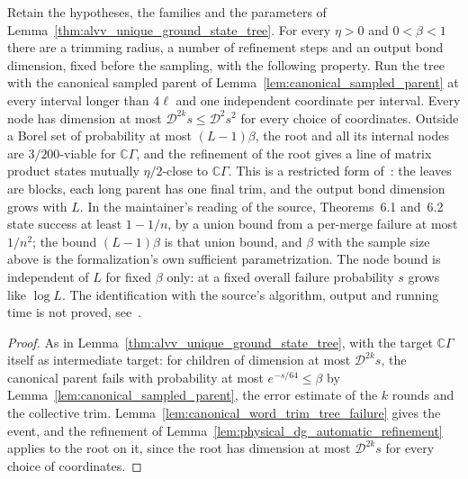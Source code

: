 \begin{lemma}
    \label{lem:alvv_unique_ground_state_tree_probability}
    \leanok
    Retain the hypotheses, the families and the parameters of
    Lemma~\ref{thm:alvv_unique_ground_state_tree}. For every $\eta>0$ and
    $0<\beta<1$ there are a trimming radius, a number of refinement steps and
    an output bond dimension, fixed before the sampling, with the following
    property. Run the tree with the canonical sampled parent of
    Lemma~\ref{lem:canonical_sampled_parent} at every interval longer than
    $4\ell$ and one independent coordinate per interval. Every node has
    dimension at most $\mathcal D^{2k}s\le\mathcal D^2s^2$ for every choice
    of coordinates. Outside a Borel set of probability at most $(L-1)\beta$,
    the root and all its internal nodes are $3/200$-viable for
    $\mathbb C\Gamma$, and the refinement of the root gives a line of matrix
    product states mutually $\eta/2$-close to $\mathbb C\Gamma$. This is a
    restricted form of~\cite[Theorem~\texttt{t:unique}, lines
        1829--1855]{Arad2016RigorousRG}: the leaves are blocks, each long
    parent has one final trim, and the output bond dimension grows with $L$.
    In the maintainer's reading of the source, Theorems~6.1 and~6.2 state
    success at least $1-1/n$, by a union bound from a per-merge failure at
    most $1/n^2$; the bound $(L-1)\beta$ is that union bound, and $\beta$
    with the sample size above is the formalization's own sufficient
    parametrization. The node bound is independent of $L$ for fixed $\beta$
    only: at a fixed overall failure probability $s$ grows like $\log L$.
    The identification with the source's algorithm, output and running time
    is not proved, see~\cite{gap:alvv16_unique_ground_state_tree}.
\end{lemma}
\begin{proof}\leanok
    As in Lemma~\ref{thm:alvv_unique_ground_state_tree}, with the target
    $\mathbb C\Gamma$ itself as intermediate target: for children of
    dimension at most $\mathcal D^{2k}s$, the canonical parent fails with
    probability at most $e^{-s/64}\le\beta$ by
    Lemma~\ref{lem:canonical_sampled_parent}, the error estimate of the $k$
    rounds and the collective trim. Lemma~\ref{lem:canonical_word_trim_tree_failure}
    gives the event, and the refinement of
    Lemma~\ref{lem:physical_dg_automatic_refinement} applies to the root on it,
    since the root has dimension at most $\mathcal D^{2k}s$ for every choice of
    coordinates.
\end{proof}
